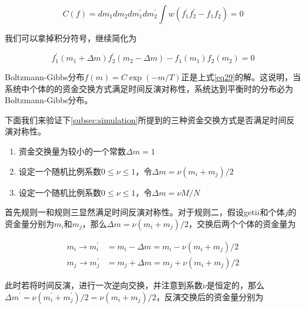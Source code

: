\documentclass[tsinghuacite]{HustGraduPaper}
\begin{document}
		\begin{equation}
			C(f) = dm_1 dm_2 dm_1^{'} dm_2^{'} \int  w ( f_{1}^{'} f_{2}^{'} -  f_{1} f_{2} ) = 0  \label{eq28}
		\end{equation}
		
		\vspace{1.5em}  

		我们可以拿掉积分符号，继续简化为
		
		\begin{equation}
			f_{1}^{'}(m_1 + \Delta m) f_{2}^{'}(m_2 - \Delta m) -  f_{1}(m_1) f_{2}(m_2)  = 0  \label{eq29}
		\end{equation}
		
		\vspace{1.5em}  

		Boltzmann-Gibbs分布$f(m) = C \exp( - m /T)$正是上式\eqref{eq29}的解。这说明，当系统中个体的的资金交换方式满足时间反演对称性，系统达到平衡时的分布必为Boltzmann-Gibbs分布。
		
		下面我们来验证下\autoref{subsec:simulation}所提到的三种资金交换方式是否满足时间反演对称性。
		
		\begin{enumerate}[label=(\roman*)]
		
			\item 资金交换量为较小的一个常数$\Delta m = 1$ \label{item1}
			
			\item 设定一个随机比例系数$0 \leq \nu \leq 1$，令$\Delta m = \nu (m_i + m_j)/2$
			
			\item 设定一个随机比例系数$0 \leq \nu \leq 1$，令$\Delta m = \nu M/N$
		
		\end{enumerate}
		
		首先规则一和规则三显然满足时间反演对称性。对于规则二，假设geti$i$和个体$j$的资金量分别为$m_i$和$m_j$，那么$\Delta m = \nu (m_i + m_j) /2$，交换后两个个体的资金量为
		
		\begin{align}
			m_i \rightarrow m_{i}^{'} &= m_i - \Delta m = m_i -  \nu (m_i + m_j) /2  \\
			m_j \rightarrow m_{j}^{'} &= m_j + \Delta m = m_j + \nu (m_i + m_j) /2  \label{eq30}
		\end{align}
		
		\vspace{1.5em} 
		
		此时若将时间反演，进行一次逆向交换，并注意到系数$\nu$是恒定的，那么$\Delta m^{'} = \nu(m_{i}^{'} + m_{j}^{'} )/2 = \nu (m_i + m_j) /2$，反演交换后的资金量分别为
		
\end{document}
